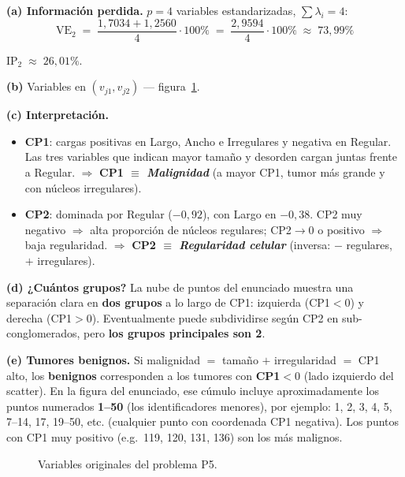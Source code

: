 \documentclass[11pt,a4paper]{article}
\newcommand{\arr}[4]{%
  \draw[-{Stealth[length=2mm]},thick,usachteal!80!black] (axis cs:0,0) -- (axis cs:#1,#2);%
  \node[anchor=#4,font=\small] at (axis cs:#1,#2) {\textbf{#3}};%
}
\begin{document}
\begin{solbox}
\textbf{(a) Información perdida.} $p=4$ variables estandarizadas, $\sum\lambda_i=4$:
\[
\mathrm{VE}_2 \;=\; \frac{1{,}7034+1{,}2560}{4}\cdot 100\% \;=\; \frac{2{,}9594}{4}\cdot 100\% \;\approx\; 73{,}99\%
\]
\begin{respbox}
$\boxed{\mathrm{IP}_2 \;\approx\; 26{,}01\%}$.
\end{respbox}

\textbf{(b)} Variables en $(v_{j1}, v_{j2})$ — figura~\ref{fig:p5var}.

\textbf{(c) Interpretación.}
\begin{itemize}[noitemsep,leftmargin=*]
\item \textbf{CP1}: cargas positivas en Largo, Ancho e Irregulares y negativa en Regular. Las tres variables que indican mayor tamaño y desorden cargan juntas frente a Regular. $\Rightarrow$ \textbf{CP1 $\equiv$ \emph{Malignidad}} (a mayor CP1, tumor más grande y con núcleos irregulares).
\item \textbf{CP2}: dominada por Regular ($-0{,}92$), con Largo en $-0{,}38$. CP2 muy negativo $\Rightarrow$ alta proporción de núcleos regulares; CP2$\to 0$ o positivo $\Rightarrow$ baja regularidad. $\Rightarrow$ \textbf{CP2 $\equiv$ \emph{Regularidad celular}} (inversa: $-$ regulares, $+$ irregulares).
\end{itemize}

\textbf{(d) ¿Cuántos grupos?} La nube de puntos del enunciado muestra una separación clara en \textbf{dos grupos} a lo largo de CP1: izquierda (CP1$<0$) y derecha (CP1$>0$). Eventualmente puede subdividirse según CP2 en sub-conglomerados, pero \textbf{los grupos principales son 2}.

\textbf{(e) Tumores benignos.} Si malignidad $=$ tamaño $+$ irregularidad $=$ CP1 alto, los \textbf{benignos} corresponden a los tumores con \textbf{CP1$<0$} (lado izquierdo del scatter). En la figura del enunciado, ese cúmulo incluye aproximadamente los puntos numerados \textbf{1--50} (los identificadores menores), por ejemplo: 1, 2, 3, 4, 5, 7--14, 17, 19--50, etc. (cualquier punto con coordenada CP1 negativa). Los puntos con CP1 muy positivo (e.g.\ 119, 120, 131, 136) son los más malignos.
\end{solbox}

\begin{figure}[H]
\centering
{}
\caption{Variables originales del problema P5.}
\label{fig:p5var}
\end{figure}
\end{document}
